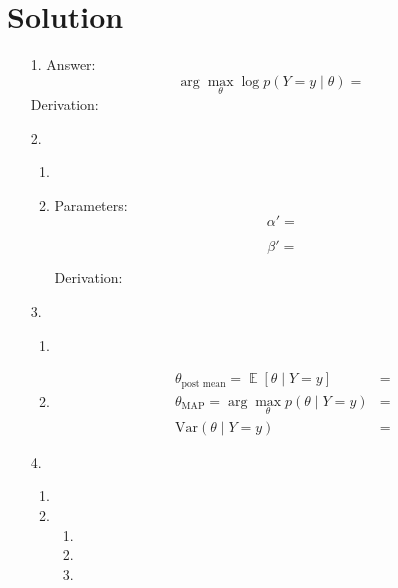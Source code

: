 \documentclass[submit]{harvardml}
\newenvironment{answer}
  {\section*{Solution}}
{}
\DeclareMathOperator*{\mean}{\mathbb{E}}
\begin{document}
\begin{answer}
  \begin{enumerate}
    \item[1.]
      Answer:
      \[
        \arg \max_{\theta} \log p(Y = y \mid \theta) =
      \]
      Derivation:

    \item[2.]
      \begin{enumerate}
        \item

        \item

              Parameters:
              \[
                \alpha' =
              \]

              \[
                \beta' =
              \]

              Derivation:

      \end{enumerate}

    \item[3.]

      \begin{enumerate}
        \item

        \item
              \begin{align*}
                \theta_{\text{post mean}} = \mean [\theta \mid Y = y]     & = \\
                \theta_{\text{MAP}} =\arg \max_{\theta}p(\theta \mid Y=y) & = \\
                \mathrm{Var}(\theta \mid Y = y)                           & =
              \end{align*}

      \end{enumerate}

    \item[4.]

      \begin{enumerate}
        \item

        \item
              \begin{enumerate}
                \item

                \item

                \item
              \end{enumerate}


\end{enumerate}
\end{enumerate}
\end{answer}
\end{document}
